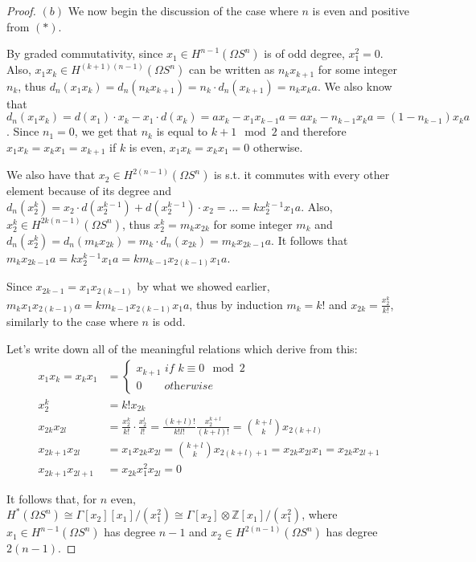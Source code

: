 \documentclass{article}
\newcommand{\numberset}{\mathbb}
\newcommand{\Z}{\numberset{Z}}
\begin{document}
\begin{proof}
    $(b)$ We now begin the discussion of the case where $n$ is even and
    positive from $(*)$.

    By graded commutativity, since $x_1\in H^{n-1}(\Omega S^n)$ is of odd
    degree, $x_1^2=0$. Also, $x_1x_k\in H^{(k+1)(n-1)}(\Omega S^n)$ can be
    written as $n_kx_{k+1}$ for some integer $n_k$, thus
    $d_n(x_1x_k)=d_n(n_kx_{k+1})=n_k\cdot d_n(x_{k+1})=n_kx_ka$. We also
    know that $d_n(x_1x_k)=d(x_1)\cdot x_k-x_1\cdot
    d(x_k)=ax_k-x_1x_{k-1}a=ax_k-n_{k-1}x_k a=(1-n_{k-1})x_ka$. Since
    $n_1=0$, we get that $n_k$ is equal to $k+1\mod 2$ and therefore
    $x_1x_k=x_kx_1=x_{k+1}$ if $k$ is even, $x_1x_k=x_kx_1=0$ otherwise.

    We also have that $x_2\in H^{2(n-1)}(\Omega S^n)$ is s.t. it commutes with
    every other element because of its degree and $d_n(x_2^k)=x_2\cdot
    d(x_2^{k-1})+d(x_2^{k-1})\cdot x_2=\ldots=kx_2^{k-1}x_1a$. Also, $x_2^k\in
    H^{2k(n-1)}(\Omega S^n)$, thus $x_2^k=m_kx_{2k}$ for some integer $m_k$ and
    $d_n(x_2^k)=d_n(m_kx_{2k})=m_k\cdot d_n(x_{2k})=m_kx_{2k-1}a$. It follows
    that $m_kx_{2k-1}a=kx_2^{k-1}x_1a=km_{k-1}x_{2(k-1)}x_1a$.

    Since $x_{2k-1}=x_1x_{2(k-1)}$ by what we showed earlier,
    $m_kx_1x_{2(k-1)}a=km_{k-1}x_{2(k-1)}x_1a$, thus by induction $m_k=k!$ and
    $x_{2k}=\frac{x_2^k}{k!}$, similarly to the case where $n$ is odd.

    Let's write down all of the meaningful relations which derive from this:
    \begin{align*}
        x_1x_k=x_kx_1 &=\begin{cases}
            x_{k+1}\textit{ if }k\equiv 0\mod 2 \\
            0\quad\quad\textit{otherwise}
        \end{cases} \\
        x_2^k &=k!x_{2k} \\
        x_{2k}x_{2l} &=\frac{x_2^k}{k!}\cdot\frac{x_2^l}{l!}=\frac{(k+l)!}{k!l!}
        \frac{x_2^{k+l}}{(k+l)!}=\binom{k+l}{k}x_{2(k+l)} \\
        x_{2k+1}x_{2l} &=x_1x_{2k}x_{2l}=\binom{k+l}{k}x_{2(k+l)+1}=
        x_{2k}x_{2l}x_1=x_{2k}x_{2l+1} \\
        x_{2k+1}x_{2l+1} &=x_{2k}x_1^2x_{2l}=0
    \end{align*}
    
    It follows that, for $n$ even, $H^*(\Omega S^n)\cong\Gamma[x_2][x_1]/(x_1^2)
    \cong\Gamma[x_2]\otimes\Z[x_1]/(x_1^2)$, where $x_1\in H^{n-1}(\Omega S^n)$
    has degree $n-1$ and $x_2\in H^{2(n-1)}(\Omega S^n)$ has degree $2(n-1)$.
\end{proof}

\printbibliography
\end{document}
